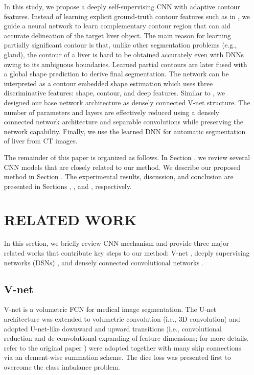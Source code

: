 \documentclass[journal]{IEEEtran}
\begin{document}
In this study, we propose a deeply self-supervising CNN with adaptive contour features. Instead of learning explicit ground-truth contour features such as in \cite{chen2017dcan}, we guide a neural network to learn complementary contour region that can aid accurate delineation of the target liver object. The main reason for learning partially significant contour is that, unlike other segmentation problems (e.g., gland), the contour of a liver is hard to be obtained accurately even with DNNs owing to its ambiguous boundaries. Learned partial contours are later fused with a global shape prediction to derive final segmentation. The network can be interpreted as a contour embedded shape estimation which uses three discriminative features: shape, contour, and deep features. Similar to \cite{gibson2018automatic}, we designed our base network architecture as densely connected V-net \cite{milletari2016v} structure. The number of parameters and layers are effectively reduced using a densely connected network architecture \cite{huang2017densely} and separable convolutions while preserving the network capability. Finally, we use the learned DNN for automatic segmentation of liver from CT images.\par
The remainder of this paper is organized as follows. In Section {}, we review several CNN models that are closely related to our method. We describe our proposed method in Section {}. The experimental results, discussion, and conclusion are presented in Sections {}, {}, and {}, respectively.
\newline



\section{RELATED WORK}
In this section, we briefly review CNN mechanism and provide three major related works that contribute key steps to our method: V-net \cite{milletari2016v}, deeply supervising networks (DSNs) \cite{lee2015deeply, dou20173d}, and densely connected convolutional networks \cite{huang2017densely}.

\subsection{V-net}
V-net \cite{milletari2016v} is a volumetric FCN for medical image segmentation. The U-net architecture was extended \cite{ronneberger2015u} to volumetric convolution (i.e., 3D convolution) and adopted U-net-like downward and upward transitions (i.e., convolutional reduction and de-convolutional expanding of feature dimensions; for more details, refer to the original paper \cite{milletari2016v}) were adopted together with many skip connections via an element-wise summation scheme. The dice loss was presented first to overcome the class imbalance problem.
\end{document}
